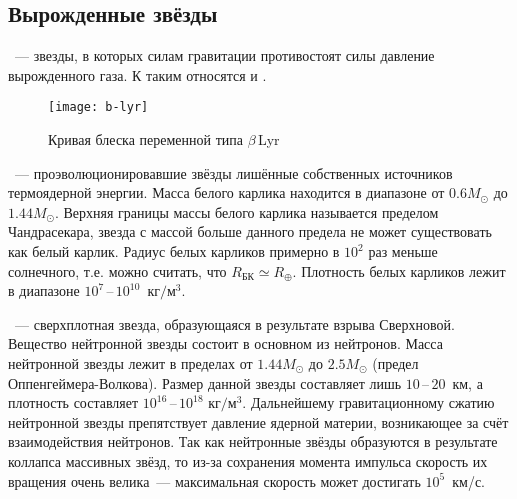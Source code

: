 \subsection{Вырожденные звёзды}
~--- звезды, в которых силам гравитации противостоят силы давление вырожденного газа. К таким относятся  и . 

\begin{figure}[!h]
	\centering
	\begin{minipage}[c]{0.49\tw}
 	\end{minipage}
 	\hfill
 	\begin{minipage}[c]{0.49\tw}
 		\centering
 		\texttt{[image: b-lyr]}	
 	\end{minipage}
 	\caption{Кривая блеска переменной типа $\beta$\,Lyr}
 	\label{pic:b-lyr}
 	\vspace{-.8pc}
\end{figure}
~--- проэволюционировавшие звёзды лишённые собственных источников термоядерной энергии. Масса белого карлика находится в диапазоне от $0.6M_{\odot}$ до $1.44 M_{\odot}$. Верхняя границы массы белого карлика называется пределом Чандрасекара, звезда с массой больше данного предела не может существовать как белый карлик. Радиус белых карликов примерно в $10^2$ раз меньше солнечного, т.е. можно считать, что $R_\text{БК} \simeq R_\oplus$. Плотность белых карликов лежит в диапазоне $10^7$\,--\,$10^{10}$~$\text{кг}/\text{м}^3$.

~--- сверхплотная звезда, образующаяся в результате взрыва Сверхновой. Вещество нейтронной звезды состоит в основном из нейтронов. Масса нейтронной звезды лежит в пределах от $1.44M_{\odot}$ до $2.5M_{\odot}$ (предел Оппенгеймера-Волкова). Размер данной звезды составляет лишь $10$\,--\,$20$~км, а плотность составляет $10^{16}$\,--\,$10^{18}$ $\text{кг}/\text{м}^3$.  Дальнейшему гравитационному сжатию нейтронной звезды препятствует давление ядерной материи, возникающее за счёт взаимодействия нейтронов. Так как нейтронные звёзды образуются в результате  коллапса массивных звёзд, то из-за сохранения момента импульса скорость их вращения очень велика~--- максимальная скорость может достигать $10^5$~км/с.